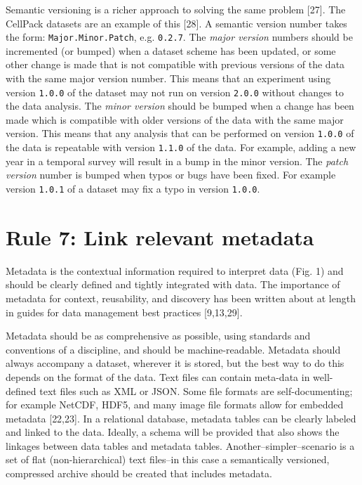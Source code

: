 \documentclass[10pt,letterpaper]{article}
\begin{document}
Semantic versioning is a richer approach to solving the same problem
{[}27{]}. The CellPack datasets are an example of this {[}28{]}. A
semantic version number takes the form: \texttt{Major.Minor.Patch}, e.g.
\texttt{0.2.7}. The \emph{major version} numbers should be incremented
(or bumped) when a dataset scheme has been updated, or some other change
is made that is not compatible with previous versions of the data with
the same major version number. This means that an experiment using
version \texttt{1.0.0} of the dataset may not run on version
\texttt{2.0.0} without changes to the data analysis. The \emph{minor
version} should be bumped when a change has been made which is
compatible with older versions of the data with the same major version.
This means that any analysis that can be performed on version
\texttt{1.0.0} of the data is repeatable with version \texttt{1.1.0} of
the data. For example, adding a new year in a temporal survey will
result in a bump in the minor version. The \emph{patch version} number
is bumped when typos or bugs have been fixed. For example version
\texttt{1.0.1} of a dataset may fix a typo in version \texttt{1.0.0}.

\section*{Rule 7: Link relevant
metadata}\label{rule-7-link-relevant-metadata}

Metadata is the contextual information required to interpret data (Fig.
1) and should be clearly defined and tightly integrated with data. The
importance of metadata for context, reusability, and discovery has been
written about at length in guides for data management best practices
{[}9,13,29{]}.

Metadata should be as comprehensive as possible, using standards and
conventions of a discipline, and should be machine-readable. Metadata
should always accompany a dataset, wherever it is stored, but the best
way to do this depends on the format of the data. Text files can contain
meta-data in well-defined text files such as XML or JSON. Some file
formats are self-documenting; for example NetCDF, HDF5, and many image
file formats allow for embedded metadata {[}22,23{]}. In a relational
database, metadata tables can be clearly labeled and linked to the data.
Ideally, a schema will be provided that also shows the linkages between
data tables and metadata tables. Another--simpler--scenario is a set of
flat (non-hierarchical) text files--in this case a semantically
versioned, compressed archive should be created that includes metadata.
\end{document}
